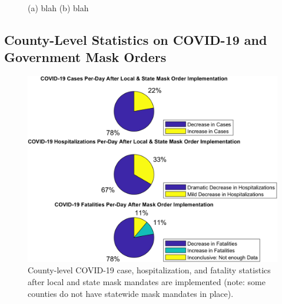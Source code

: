 \documentclass[]{article}
\begin{document}
\begin{figure}
	\centering
	\caption{(a) blah (b) blah}
	\label{fig:foobar}
\end{figure}

\FloatBarrier

\subsection{County-Level Statistics on COVID-19 and Government Mask Orders}

\begin{figure}
	\centering
	\includegraphics[width=\linewidth]{pie charts/mask_orders.png}
	\vspace{2mm}
	\caption{County-level COVID-19 case, hospitalization, and fatality statistics after local and state mask mandates are implemented (note: some counties do not have statewide mask mandates in place).}
\end{figure}
\end{document}
